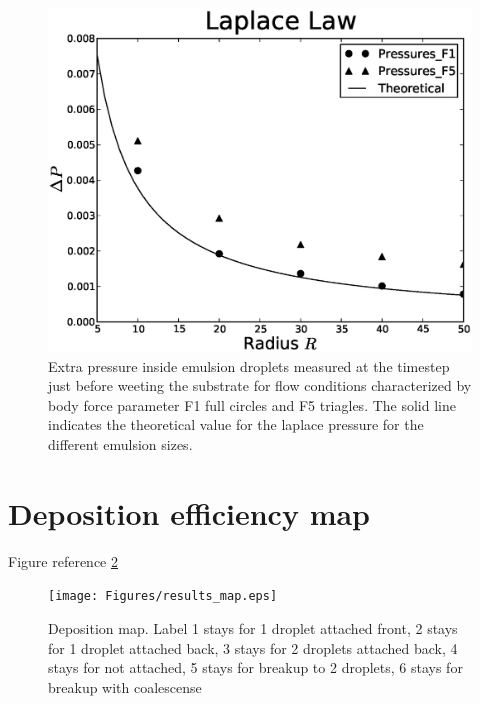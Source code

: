 \documentclass{article}
\begin{document}
\begin{figure}[h!]
\includegraphics[width=1\textwidth]{Figures/comparison_another_approach.eps}
\caption{Extra pressure inside emulsion droplets measured at the timestep just before weeting the substrate for flow conditions characterized by body force parameter F1 full circles and F5 triagles. The solid line indicates the theoretical value for the laplace pressure for the different emulsion sizes.\label{fig:extra:pressure}}
\end{figure}

\pagebreak
\section{Deposition efficiency map}

Figure reference \ref{fig:deposition:map}

\begin{figure}[h!]
\texttt{[image: Figures/results\_map.eps]}
\caption{Deposition map.  Label 1 stays for 1 droplet attached front, 2 stays for 1 droplet attached back, 3 stays for 2 droplets attached back, 4 stays for not attached, 5 stays for breakup to 2 droplets, 6 stays for breakup with coalescense\label{fig:deposition:map}}
\end{figure}

\pagebreak
\end{document}
